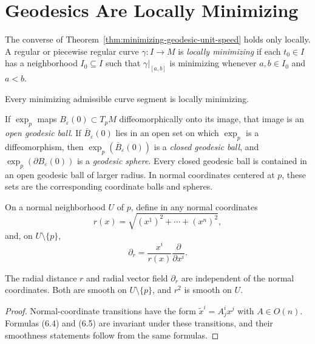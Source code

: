 \section{Geodesics Are Locally Minimizing}

The converse of Theorem~\ref{thm:minimizing-geodesic-unit-speed} holds only
locally.  A regular or piecewise regular curve $\gamma:I\to M$ is
\emph{locally minimizing} if each $t_0\in I$ has a neighborhood $I_0\subseteq
I$ such that $\gamma|_{[a,b]}$ is minimizing whenever $a,b\in I_0$ and
$a<b$.

\begin{lemma}
\label{lem:minimizing-curves-locally-minimizing}

Every minimizing admissible curve segment is locally minimizing.
\end{lemma}

If $\exp_p$ maps $B_\varepsilon(0)\subset T_pM$ diffeomorphically onto its
image, that image is an \emph{open geodesic ball}.  If
$\overline B_\varepsilon(0)$ lies in an open set on which $\exp_p$ is a
diffeomorphism, then $\exp_p(\overline B_\varepsilon(0))$ is a
\emph{closed geodesic ball}, and $\exp_p(\partial B_\varepsilon(0))$ is a
\emph{geodesic sphere}.  Every closed geodesic ball is contained in an open
geodesic ball of larger radius.  In normal coordinates centered at $p$, these
sets are the corresponding coordinate balls and spheres.

On a normal neighborhood $U$ of $p$, define in any normal coordinates
\begin{equation}
r(x) = \sqrt{(x^1)^2 + \cdots + (x^n)^2}, \tag{6.4}
\end{equation}
and, on $U\setminus\{p\}$,
\begin{equation}
\partial_r = \frac{x^i}{r(x)} \frac{\partial}{\partial x^i}. \tag{6.5}
\end{equation}

\begin{lemma}
\label{lem:radial-distance-well-defined}

The radial distance $r$ and radial vector field $\partial_r$ are independent
of the normal coordinates.  Both are smooth on $U\setminus\{p\}$, and $r^2$
is smooth on $U$.
\end{lemma}

\begin{proof}
\sketch
Normal-coordinate transitions have the form
$\widetilde x^i=A^i_jx^j$ with $A\in O(n)$.  Formulas (6.4) and (6.5) are
invariant under these transitions, and their smoothness statements follow
from the same formulas.
\end{proof}

